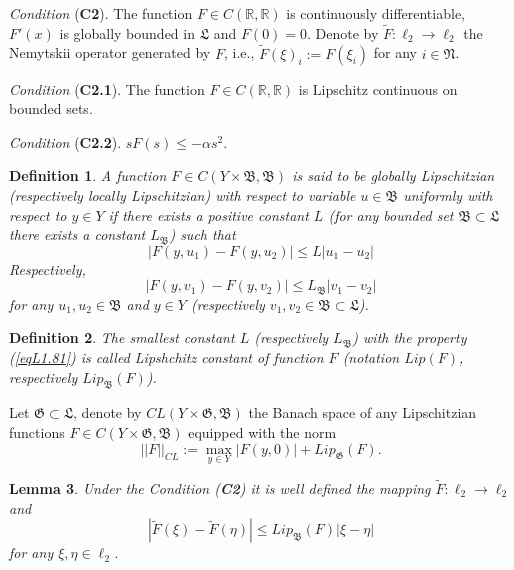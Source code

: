 \documentclass{amsart}%
\newtheorem{lemma}{Lemma}[section]
\newtheorem{definition}[lemma]{Definition}
\begin{document}
\emph{Condition} (\textbf{C2}). \label{C2}
The function $F\in C(\mathbb
R,\mathbb R)$ is continuously differentiable, \(F'(x)\)
is globally bounded in \(\mathfrak L\)
 and $F(0)=0$. Denote by $
\widetilde{F}:\ell_{2}\to \ell_{2}$ the Nemytskii operator
generated by $F$, i.e., $\widetilde{F}(\xi)_{i}:=F(\xi_{i})$ for
any $i\in \mathfrak N$.

{\color{violet} 
\emph{Condition} (\textbf{C2.1}). \label{C2.1}
The function $F\in C(\mathbb
R,\mathbb R)$  is Lipschitz continuous on bounded sets.

\emph{Condition} (\textbf{C2.2}). \label{C2.2}
\(sF(s)\leq -\alpha s^2\).
}

\begin{definition}\label{defL1.8} A function $F\in C(Y\times \mathfrak B,\mathfrak
B)$ is said to be globally Lipschitzian (respectively locally Lipschitzian) with respect to variable
$u\in \mathfrak B$ uniformly with respect to $y\in Y$ if there
exists a positive constant $L$ (for any bounded set \( \mathfrak B \subset \mathfrak L\) there exists a constant \(L_{\mathfrak B}\)) such that
\begin{equation}\label{eqL1.81}
|F(y,u_1)-F(y,u_2)|\le L |u_1-u_2|
\end{equation}
Respectively, 
\begin{equation}\label{eqL1.82}
|F(y,v_1)-F(y,v_2)|\le L_{\mathfrak B} |v_1-v_2|
\end{equation}
for any $u_1,u_2\in \mathfrak B$ and $y\in Y$ (respectively \(v_1, v_2 \in \mathfrak B \subset \mathfrak L\)).
\end{definition}

\begin{definition}\label{defL2.8}
The smallest constant $L$ (respectively \(L_{\mathfrak B}\)) with the property (\ref{eqL1.81}) is
called Lipshchitz constant of function $F$ (notation $Lip(F)$, respectively \(Lip_{\mathfrak B}(F)\)).
\end{definition}

Let \(\mathfrak G \subset \mathfrak L\), denote by $CL(Y\times \mathfrak G,\mathfrak B)$
 the Banach space of any 
Lipschitzian functions $F\in C(Y\times \mathfrak G,\mathfrak B)$
equipped with the norm
\begin{equation}
||F||_{CL}:=\max\limits_{y\in Y}|F(y,0)|+Lip_{\mathfrak G}(F).\nonumber
\end{equation}

\begin{lemma}\label{l2.2}\cite{Che_2015} Under the Condition (\textbf{C2})
it is well defined the mapping $\widetilde{F}:\ell_{2}\to
\ell_{2}$ and
\begin{equation}\label{eq2.2}
|\widetilde{F}(\xi)-\widetilde{F}(\eta)|\le Lip_{\mathfrak B}(F)|\xi -\eta|
\end{equation}
for any $\xi,\eta\in \ell_{2}$.
\end{lemma}
\end{document}
